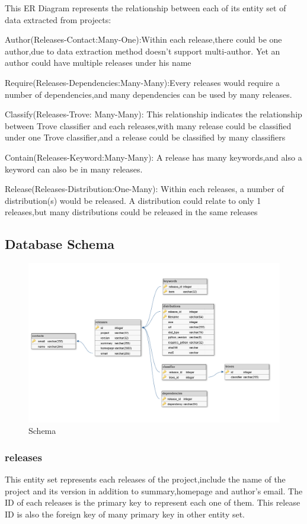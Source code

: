 \documentclass[a4paper,12pt]{article}
\begin{document}
This ER Diagram represents the relationship between each of its entity set of data extracted from projects:

Author(Releases-Contact:Many-One):Within each release,there could be one author,due to data extraction method doesn't support multi-author. Yet an author could have multiple releases under his name

Require(Releases-Dependencies:Many-Many):Every releases would require a number of dependencies,and many dependencies can be used by many releases.

Classify(Releases-Trove: Many-Many): This relationship indicates the relationship between Trove classifier and each releases,with many release could be classified
under one Trove classifier,and a release could be classified by many classifiers

Contain(Releases-Keyword:Many-Many): A release has many keywords,and also a keyword can also be in many releases.
  
Release(Releases-Distribution:One-Many): Within each releases, a number of distribution(s) would be released. A distribution could relate to only 1 releases,but many distributions could be released in the same releases

\subsection{Database Schema}

\begin{figure}[htp]
    \centering
    \includegraphics[width=17cm]{Schema.png}
    \caption{Schema}
    \label{fig:Schema}
\end{figure}


\subsubsection{releases}
This entity set represents each releases of the project,include the name of the project and its version in addition to summary,homepage and author's email. The ID of each releases is the primary key to represent each one of them.
This release ID is also the foreign key of many primary key in other entity set.
\end{document}
